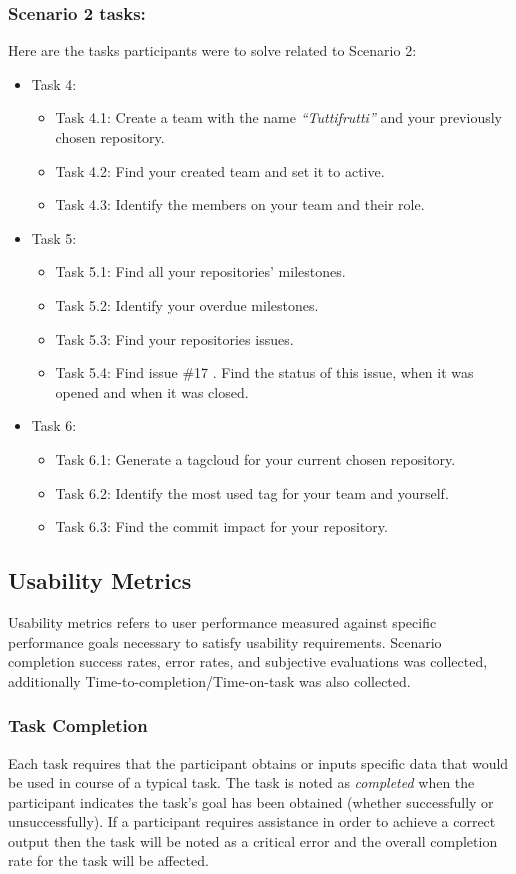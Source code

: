 \subsubsection{Scenario 2 tasks:}
Here are the tasks participants were to solve related to Scenario 2:
\begin{itemize}
\item Task 4:
	\begin{itemize}
		\item Task 4.1: Create a team with the name \emph{“Tuttifrutti”} and your previously chosen repository.
		\item Task 4.2: Find your created team and set it to active.
		\item Task 4.3: Identify the members on your team and their role.
	\end{itemize}
\item Task 5:
	\begin{itemize}
		\item Task 5.1: Find all your repositories’ milestones.
		\item Task 5.2: Identify your overdue milestones.
		\item Task 5.3: Find your repositories issues.
		\item Task 5.4: Find issue \#17 . Find the status of this issue, when it was opened and when it was closed.
	\end{itemize}
\item Task 6:
	\begin{itemize}
		\item Task 6.1: Generate a tagcloud for your current chosen repository.
		\item Task 6.2: Identify the most used tag for your team and yourself.
		\item Task 6.3: Find the commit impact for your repository.
	\end{itemize}
\end{itemize}

\subsection{Usability Metrics}
Usability metrics refers to user performance measured against specific performance goals necessary to satisfy usability requirements. Scenario completion success rates, error rates, and subjective evaluations was collected, additionally Time-to-completion/Time-on-task was also collected.

\subsubsection{Task Completion}
Each task requires that the participant obtains or inputs specific data that would be used in course of a typical task. The task is noted as \emph{completed} when the participant indicates the task's goal has been obtained (whether successfully or unsuccessfully).  If a participant requires assistance in order to achieve a correct output then the task will be noted as a critical error and the overall completion rate for the task will be affected.


